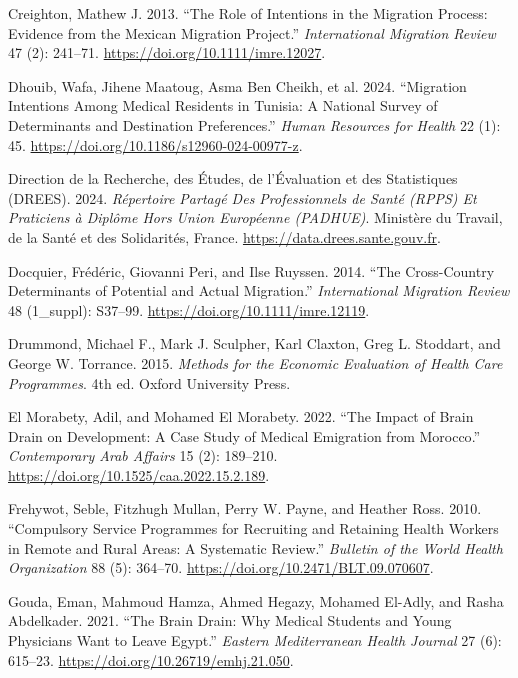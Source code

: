 \documentclass[
  11pt,
  a4paper]{article}
\newlength{\cslhangindent}
\newenvironment{CSLReferences}[2] %
 {\begin{list}{}{%
  \setlength{\itemindent}{0pt}
  \setlength{\leftmargin}{0pt}
  \setlength{\parsep}{0pt}
  \ifodd #1
   \setlength{\leftmargin}{\cslhangindent}
   \setlength{\itemindent}{-1\cslhangindent}
  \fi
  \setlength{\itemsep}{#2\baselineskip}}}
 {\end{list}}
\begin{document}
\begin{CSLReferences}{1}{1}
Creighton, Mathew J. 2013. {``The Role of Intentions in the Migration
Process: Evidence from the {Mexican Migration Project}.''}
\emph{International Migration Review} 47 (2): 241--71.
\url{https://doi.org/10.1111/imre.12027}.

Dhouib, Wafa, Jihene Maatoug, Asma Ben Cheikh, et al. 2024. {``Migration
Intentions Among Medical Residents in {Tunisia}: A National Survey of
Determinants and Destination Preferences.''} \emph{Human Resources for
Health} 22 (1): 45. \url{https://doi.org/10.1186/s12960-024-00977-z}.

Direction de la Recherche, des Études, de l'Évaluation et des
Statistiques (DREES). 2024. \emph{R{é}pertoire Partag{é} Des
Professionnels de Sant{é} ({RPPS}) Et Praticiens {à} Dipl{ô}me Hors
Union Europ{é}enne ({PADHUE})}. Minist{è}re du Travail, de la Sant{é} et
des Solidarit{é}s, France. \url{https://data.drees.sante.gouv.fr}.

Docquier, Frédéric, Giovanni Peri, and Ilse Ruyssen. 2014. {``The
Cross-Country Determinants of Potential and Actual Migration.''}
\emph{International Migration Review} 48 (1\_suppl): S37--99.
\url{https://doi.org/10.1111/imre.12119}.

Drummond, Michael F., Mark J. Sculpher, Karl Claxton, Greg L. Stoddart,
and George W. Torrance. 2015. \emph{Methods for the Economic Evaluation
of Health Care Programmes}. 4th ed. Oxford University Press.

El Morabety, Adil, and Mohamed El Morabety. 2022. {``The Impact of Brain
Drain on Development: {A} Case Study of Medical Emigration from
{Morocco}.''} \emph{Contemporary Arab Affairs} 15 (2): 189--210.
\url{https://doi.org/10.1525/caa.2022.15.2.189}.

Frehywot, Seble, Fitzhugh Mullan, Perry W. Payne, and Heather Ross.
2010. {``Compulsory Service Programmes for Recruiting and Retaining
Health Workers in Remote and Rural Areas: A Systematic Review.''}
\emph{Bulletin of the World Health Organization} 88 (5): 364--70.
\url{https://doi.org/10.2471/BLT.09.070607}.

Gouda, Eman, Mahmoud Hamza, Ahmed Hegazy, Mohamed El-Adly, and Rasha
Abdelkader. 2021. {``The Brain Drain: Why Medical Students and Young
Physicians Want to Leave {Egypt}.''} \emph{Eastern Mediterranean Health
Journal} 27 (6): 615--23. \url{https://doi.org/10.26719/emhj.21.050}.


\end{CSLReferences}
\end{document}
